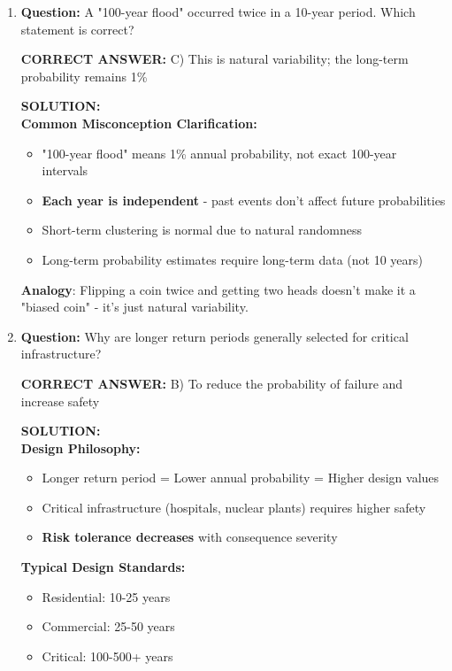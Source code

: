 \documentclass[11pt,a4paper]{article}
\newenvironment{correctanswer}
    {\color{correct}\textbf{CORRECT ANSWER: }}
    {}
\newenvironment{solutionbox}
    {\color{solution}\begin{framed}\textbf{SOLUTION:}\\\vspace{0.2cm}}
    {\end{framed}}
\begin{document}
\begin{enumerate}
\item \textbf{Question:} A "100-year flood" occurred twice in a 10-year period. Which statement is correct?

\begin{correctanswer}
C) This is natural variability; the long-term probability remains 1\%
\end{correctanswer}

\begin{solutionbox}
\textbf{Common Misconception Clarification:}
\begin{itemize}[nosep]
    \item "100-year flood" means 1\% annual probability, not exact 100-year intervals
    \item \textbf{Each year is independent} - past events don't affect future probabilities
    \item Short-term clustering is normal due to natural randomness
    \item Long-term probability estimates require long-term data (not 10 years)
\end{itemize}
\textbf{Analogy}: Flipping a coin twice and getting two heads doesn't make it a "biased coin" - it's just natural variability.
\end{solutionbox}

\item \textbf{Question:} Why are longer return periods generally selected for critical infrastructure?

\begin{correctanswer}
B) To reduce the probability of failure and increase safety
\end{correctanswer}

\begin{solutionbox}
\textbf{Design Philosophy:}
\begin{itemize}[nosep]
    \item Longer return period = Lower annual probability = Higher design values
    \item Critical infrastructure (hospitals, nuclear plants) requires higher safety
    \item \textbf{Risk tolerance decreases} with consequence severity
\end{itemize}

\textbf{Typical Design Standards:}
\begin{itemize}[nosep]
    \item Residential: 10-25 years
    \item Commercial: 25-50 years
    \item Critical: 100-500+ years
\end{itemize}
\end{solutionbox}


\end{enumerate}
\end{document}
